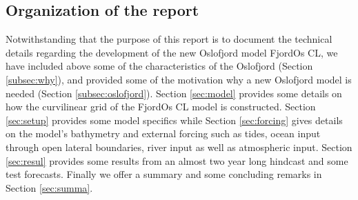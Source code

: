 \subsection{Organization of the report}
Notwithstanding that the purpose of this report is to document the technical details regarding the development of the new Oslofjord model FjordOs CL, we have included above some of the characteristics of the Oslofjord (Section \ref{subsec:why}), and provided some of the motivation why a new Oslofjord model is needed (Section \ref{subsec:oslofjord}). Section \ref{sec:model} provides some details on how the curvilinear grid of the FjordOs CL model is constructed. Section \ref{sec:setup} provides some model specifics while Section \ref{sec:forcing} gives details on the model's bathymetry and external forcing such as tides, ocean input through open lateral boundaries, river input as well as atmospheric input. Section \ref{sec:resul} provides some results from an almost two year long hindcast and some test forecasts. Finally we offer a summary and some concluding remarks in Section \ref{sec:summa}. 
